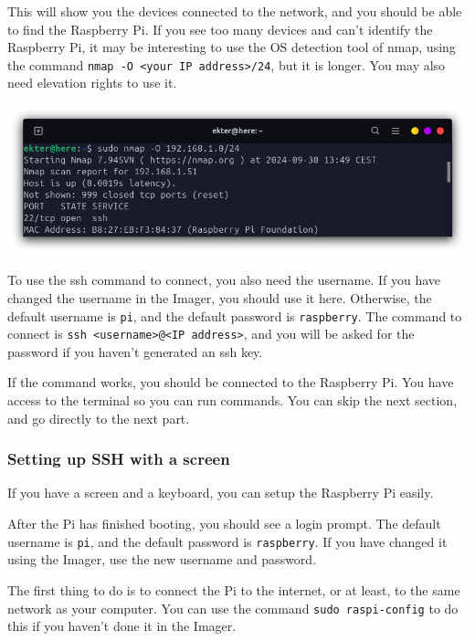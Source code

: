 \documentclass{article}
\begin{document}
This will show you the devices connected to the network, and you should be able to find the
Raspberry Pi.
If you see too many devices and can't identify the Raspberry Pi, it may be interesting to use the
OS detection tool of nmap, using the command \texttt{nmap -O <your IP address>/24}, but it is
longer. You may also need elevation rights to use it.

\includegraphics[scale=0.37]{img/nmap_O.png}

To use the ssh command to connect, you also need the username. If you have changed the username in
the Imager, you should use it here. Otherwise, the default username is \texttt{pi}, and the default
password is \texttt{raspberry}. The command to connect is \texttt{ssh <username>@<IP address>}, and
you will be asked for the password if you haven't generated an ssh key.

If the command works, you should be connected to the Raspberry Pi. You have access to the terminal
so you can run commands.
You can skip the next section, and go directly to the next part.

\subsubsection{Setting up SSH with a screen}

If you have a screen and a keyboard, you can setup the Raspberry Pi easily.

After the Pi has finished booting, you should see a login prompt. The default username is
\texttt{pi}, and the default password is \texttt{raspberry}. If you have changed it using the
Imager, use the new username and password.

The first thing to do is to connect the Pi to the internet, or at least, to the same network as
your computer. You can use the command \texttt{sudo raspi-config} to do this if you haven't done
it in the Imager.
\end{document}
